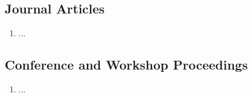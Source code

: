 \documentclass[a4paper,12pt,openright,oneside]{book}
\begin{document}
\singlespace
\subsection*{Journal Articles}

\begin{enumerate}
	
	 
	 \item ...
	 
\end{enumerate}


\subsection*{Conference and Workshop Proceedings}

\begin{enumerate}[resume]
	
	\item ...
	
\end{enumerate}



\newpage



\onehalfspace

\tableofcontents
\newpage
\vspace{1in}
\printnomenclature




\listoffigures
\newpage




\listoftables
\newpage






\newpage



\singlespace



\appendix
%
\end{document}

